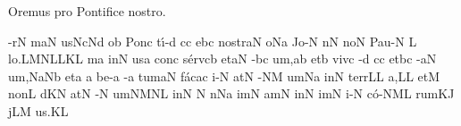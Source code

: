 \beginhymn Oremus pro Pontifice nostro.

\nosolesmescustos
{}
\Internote
\initiumgregorianum
{}%
\sgn {}-r\punctum N\egn
{}m\clivis aN\egn
\sgn {}us\pes Nc\augmentumduplex Nd\egn
\spatium
{}o{}\punctum b\egn
\spatium
\sgn Pon\engl{}\punctum c\egn
\sgn t{\'\i}-\punctum d\egn
{}c\punctum c\egn
\sgn {}e{}\pes bc\egn
\spatium
\sgn no{str}\clivis aN\egn
\sgn {}o{}\pes Na\egn
\spatium
\sgn Jo-\punctum N\egn
{}n\punctum N\egn
\sgn no{}\punctum N\egn
\spatium
\sgn P{au}-\punctum N\egn
\custos L
\lineaproxima
\sgn lo.\pes LM\spatiumparvum\clivis NL\spatiumparvum\punctum L\spatiumparvum\punctum K\augmentum L\egn
\spatium
\divisiofinalis
{}m\punctum a\egn
\sgn {}in\punctum N\egn
\sgn {}us\punctum a\egn
\spatium
\sgn con\punctum c\egn
\sgn s{\'e}{rv}\clivis cb\egn
\sgn {}et\clivis aN\egn
\spatium
{}-\pes bc\egn
\sgn {}u{m,}\punctum a\augmentum b\egn
\spatium
\divisiominor
\spatium
\sgn {}et\punctum b\egn
\spatium
\sgn viv\punctum c\egn
\sgn {}{\'\i}-\punctum d\egn
{}c\punctum c\egn
\sgn {}et\pes bc\egn
\spatium
{}-\clivis aN\egn
\sgn {}u{m,}\pes Na\augmentumduplex Nb\egn
\spatium
\divisiominor
\spatium
\sgn {}et\punctum a\egn
\spatium
\custos a
\lineaproxima
\sgn be-\punctum a\egn
{}-\punctum a\egn
\sgn tum\clivis aN\egn
\spatium
\sgn f{\'a}c\pes ac\egn
\sgn {}i-\punctum N\egn
\sgn {}at\punctum N\egn
\spatium
{}-\clivis NM\egn
\sgn {}um\pes Na\egn
\spatium
\sgn {}in\punctum N\egn
\spatium
\sgn t{e}{rr}\punctum L\augmentum L\egn
\sgn {}a,\punctum L\augmentum L\egn
\spatium
\divisiomaior
\spatium
\sgn {}et\punctum M\egn
\spatium
\sgn non\punctum L\egn
\spatium
{}d\pes KN\egn
\sgn {}at\punctum N\egn
\spatium
{}-\punctum N\egn
\sgn {}um\clivis NM\augmentumduplex NL\egn
\spatium
\divisiominor
\spatium
\sgn {}in\punctum N\egn
\spatium
\custos N
\lineaproxima
{}n\pes Na\egn
\sgn {}im\punctum N\egn
\sgn {}am\punctum N\egn
\spatium
\sgn {}in\punctum N\egn
\sgn {}im\punctum N\egn
\sgn {}i-\punctum N\egn
\sgn c{\'o}-\climacus NML\egn
\sgn rum\clivis KJ\egn
\spatium
{}j\pes LM\egn
\sgn {}u{s.}\punctum K\augmentum L\egn
\Finisgregoriana

\bigskip

